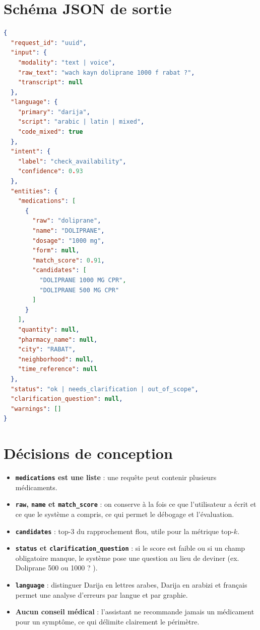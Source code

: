 \documentclass[11pt,a4paper]{article}
\begin{document}
\section{Sch\'ema JSON de sortie}

\begin{lstlisting}[language=json]
{
  "request_id": "uuid",
  "input": {
    "modality": "text | voice",
    "raw_text": "wach kayn doliprane 1000 f rabat ?",
    "transcript": null
  },
  "language": {
    "primary": "darija",
    "script": "arabic | latin | mixed",
    "code_mixed": true
  },
  "intent": {
    "label": "check_availability",
    "confidence": 0.93
  },
  "entities": {
    "medications": [
      {
        "raw": "doliprane",
        "name": "DOLIPRANE",
        "dosage": "1000 mg",
        "form": null,
        "match_score": 0.91,
        "candidates": [
          "DOLIPRANE 1000 MG CPR",
          "DOLIPRANE 500 MG CPR"
        ]
      }
    ],
    "quantity": null,
    "pharmacy_name": null,
    "city": "RABAT",
    "neighborhood": null,
    "time_reference": null
  },
  "status": "ok | needs_clarification | out_of_scope",
  "clarification_question": null,
  "warnings": []
}
\end{lstlisting}

\section{D\'ecisions de conception}

\begin{itemize}[leftmargin=*]
  \item \textbf{\texttt{medications} est une liste} : une requ\^ete peut contenir plusieurs m\'edicaments.
  \item \textbf{\texttt{raw}, \texttt{name} et \texttt{match\_score}} : on conserve \`a la fois ce que l'utilisateur a \'ecrit et ce que le syst\`eme a compris, ce qui permet le d\'ebogage et l'\'evaluation.
  \item \textbf{\texttt{candidates}} : top-3 du rapprochement flou, utile pour la m\'etrique top-$k$.
  \item \textbf{\texttt{status} et \texttt{clarification\_question}} : si le score est faible ou si un champ obligatoire manque, le syst\`eme pose une question au lieu de deviner (ex. \og Doliprane 500 ou 1000 ? \fg).
  \item \textbf{\texttt{language}} : distinguer Darija en lettres arabes, Darija en arabizi et fran\c{c}ais permet une analyse d'erreurs par langue et par graphie.
  \item \textbf{Aucun conseil m\'edical} : l'assistant ne recommande jamais un m\'edicament pour un sympt\^ome, ce qui d\'elimite clairement le p\'erim\`etre.
\end{itemize}
\end{document}
